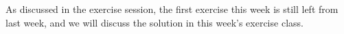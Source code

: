 \documentclass[a4paper]{article}
\begin{document}

% 


As discussed in the exercise session, the first exercise this week is still left from last week, and we will discuss the solution in this week's exercise class.



\dlz


\end{document}
